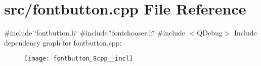 \section{src/fontbutton.cpp File Reference}
\label{fontbutton_8cpp}
{\ttfamily \#include \char`\"{}fontbutton.\+h\char`\"{}}\newline
{\ttfamily \#include \char`\"{}fontchooser.\+h\char`\"{}}\newline
{\ttfamily \#include $<$Q\+Debug$>$}\newline
Include dependency graph for fontbutton.\+cpp\+:\nopagebreak
\begin{figure}[H]
\begin{center}
\leavevmode
\texttt{[image: fontbutton\_8cpp\_\_incl]}
\end{center}
\end{figure}
